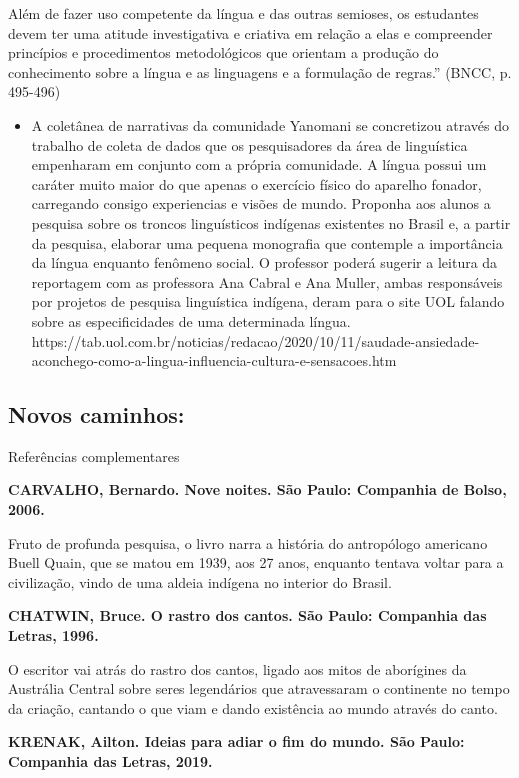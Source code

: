 \documentclass[12pt]{extarticle}
\begin{document}
Além de fazer uso competente da língua e das outras semioses, os
estudantes devem ter uma atitude investigativa e criativa em relação a
elas e compreender princípios e procedimentos metodológicos que orientam
a produção do conhecimento sobre a língua e as linguagens e a formulação
de regras.'' (BNCC, p. 495-496)

\begin{itemize}
\item
  A coletânea de narrativas da comunidade Yanomani se concretizou
  através do trabalho de coleta de dados que os pesquisadores da área de
  linguística empenharam em conjunto com a própria comunidade. A língua
  possui um caráter muito maior do que apenas o exercício físico do
  aparelho fonador, carregando consigo experiencias e visões de mundo.
  Proponha aos alunos a pesquisa sobre os troncos linguísticos indígenas
  existentes no Brasil e, a partir da pesquisa, elaborar uma pequena
  monografia que contemple a importância da língua enquanto fenômeno
  social. O professor poderá sugerir a leitura da reportagem com as
  professora Ana Cabral e Ana Muller, ambas responsáveis por projetos de
  pesquisa linguística indígena, deram para o site UOL falando sobre as
  especificidades de uma determinada língua.
  https://tab.uol.com.br/noticias/redacao/2020/10/11/saudade-ansiedade-aconchego-como-a-lingua-influencia-cultura-e-sensacoes.htm\textbf{\\
  }
\end{itemize}

\subsection{Novos caminhos:} Referências complementares

\textbf{CARVALHO, Bernardo. Nove noites. São Paulo: Companhia de Bolso,
2006.}

Fruto de profunda pesquisa, o livro narra a história do antropólogo
americano Buell Quain, que se matou em 1939, aos 27 anos, enquanto
tentava voltar para a civilização, vindo de uma aldeia indígena no
interior do Brasil.

\textbf{CHATWIN, Bruce. O rastro dos cantos. São Paulo: Companhia das
Letras, 1996.}

O escritor vai atrás do rastro dos cantos, ligado aos mitos de
aborígines da Austrália Central sobre seres legendários que atravessaram
o continente no tempo da criação, cantando o que viam e dando existência
ao mundo através do canto.

\textbf{KRENAK, Ailton. Ideias para adiar o fim do mundo. São Paulo:
Companhia das Letras, 2019.}
\end{document}
